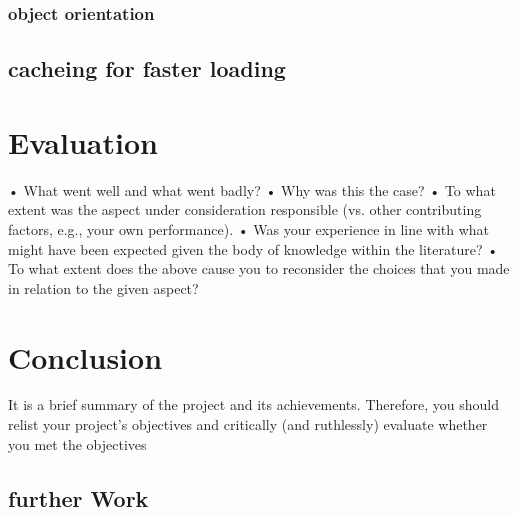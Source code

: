 \subsubsection{object orientation}

\subsection{cacheing for faster loading}

\section{Evaluation}
•	What went well and what went badly?  
•	Why was this the case?  
•	To what extent was the aspect under consideration responsible (vs. other contributing factors, e.g., your own performance).
•	Was your experience in line with what might have been expected given the body of knowledge within the literature?
•	To what extent does the above cause you to reconsider the choices that you made in relation to the given aspect?

\section{Conclusion}
It is a brief summary of the project and its achievements. Therefore, you should relist your project’s objectives and critically (and ruthlessly) evaluate whether you met the objectives
\subsection{further Work}


